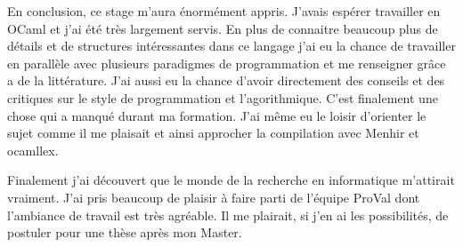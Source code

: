 \documentclass[a4paper]{article}
\begin{document}
En conclusion, ce stage m'aura énormément appris. J'avais espérer travailler 
en OCaml et j'ai été très largement servis. En plus de connaitre beaucoup
plus de détails et de structures intéressantes dans ce langage j'ai eu la 
chance de travailler en parallèle avec plusieurs paradigmes de programmation et
me renseigner grâce a de la littérature.
J'ai aussi eu la chance d'avoir directement des conseils  et des critiques 
sur le style de programmation et l'agorithmique. C'est finalement une chose qui
a manqué durant ma formation.
J'ai même eu le loisir d'orienter le sujet comme il me plaisait et ainsi 
approcher la compilation avec Menhir et ocamllex. 

Finalement j'ai 
découvert que le monde de la recherche en informatique m'attirait vraiment. 
J'ai pris beaucoup de plaisir à faire parti de l'équipe ProVal dont l'ambiance 
de travail est très agréable. Il me plairait, si j'en ai les possibilités, 
de postuler pour une thèse après mon Master.



\newpage


\end{document}

